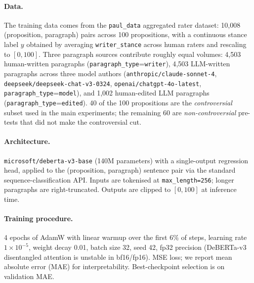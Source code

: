\paragraph{Data.}
The training data comes from the \texttt{paul\_data} aggregated rater dataset: 10{,}008 (proposition, paragraph) pairs across 100 propositions, with a continuous stance label $y$ obtained by averaging \texttt{writer\_stance} across human raters and rescaling to $[0, 100]$. Three paragraph sources contribute roughly equal volumes: 4{,}503 human-written paragraphs (\texttt{paragraph\_type}=\texttt{writer}), 4{,}503 LLM-written paragraphs across three model authors (\texttt{anthropic/claude-sonnet-4}, \texttt{deepseek/deepseek-chat-v3-0324}, \texttt{openai/chatgpt-4o-latest}, \texttt{paragraph\_type}=\texttt{model}), and 1{,}002 human-edited LLM paragraphs (\texttt{paragraph\_type}=\texttt{edited}). 40 of the 100 propositions are the \emph{controversial} subset used in the main experiments; the remaining 60 are \emph{non-controversial} pre-tests that did not make the controversial cut.

\paragraph{Architecture.}
\texttt{microsoft/deberta-v3-base} (140M parameters) with a single-output regression head, applied to the (proposition, paragraph) sentence pair via the standard sequence-classification API. Inputs are tokenised at \texttt{max\_length=256}; longer paragraphs are right-truncated. Outputs are clipped to $[0, 100]$ at inference time.

\paragraph{Training procedure.}
4 epochs of AdamW with linear warmup over the first 6\% of steps, learning rate $1\times10^{-5}$, weight decay 0.01, batch size 32, seed 42, fp32 precision (DeBERTa-v3 disentangled attention is unstable in bf16/fp16). MSE loss; we report mean absolute error (MAE) for interpretability. Best-checkpoint selection is on validation MAE.

